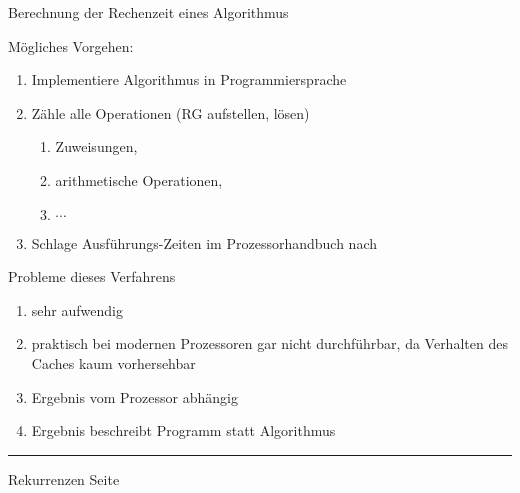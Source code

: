 \documentclass{slides}
\newcounter{mypage}
\begin{document}
\begin{slide}{}
\normalsize

\begin{center}
Berechnung der Rechenzeit eines Algorithmus
\end{center}
\vspace*{0.5cm}

\footnotesize
M\"ogliches Vorgehen:
\begin{enumerate}
\item Implementiere Algorithmus in Programmiersprache
\item Z\"ahle alle Operationen (RG aufstellen, l\"osen)
      \begin{enumerate}
      \item Zuweisungen,
      \item arithmetische Operationen,
      \item $\cdots$
      \end{enumerate}
\item Schlage Ausf\"uhrungs-Zeiten im Prozessorhandbuch nach    
\end{enumerate}

Probleme dieses Verfahrens
\begin{enumerate}
\item sehr aufwendig
\item praktisch bei modernen Prozessoren gar nicht durchf\"uhrbar,
      da Verhalten des Caches kaum vorhersehbar
\item Ergebnis vom Prozessor abh\"angig
\item Ergebnis beschreibt Programm statt Algorithmus
\end{enumerate}


\vspace*{\fill}
\tiny \addtocounter{mypage}{1}
\rule{17cm}{1mm}
Rekurrenzen  \hspace*{\fill} Seite 
\end{slide}

\end{document}
